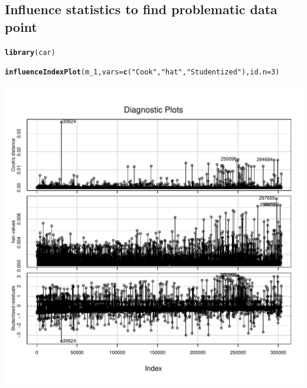 \documentclass{article}\usepackage[]{graphicx}\usepackage[]{color}
\makeatletter
\def\maxwidth{ %
  \ifdim\Gin@nat@width>\linewidth
    \linewidth
  \else
    \Gin@nat@width
  \fi
}
\newcommand{\hlnum}[1]{\textcolor[rgb]{0.686,0.059,0.569}{#1}}%
\newcommand{\hlstr}[1]{\textcolor[rgb]{0.192,0.494,0.8}{#1}}%
\newcommand{\hlstd}[1]{\textcolor[rgb]{0.345,0.345,0.345}{#1}}%
\newcommand{\hlkwc}[1]{\textcolor[rgb]{0.333,0.667,0.333}{#1}}%
\newcommand{\hlkwd}[1]{\textcolor[rgb]{0.737,0.353,0.396}{\textbf{#1}}}%
\newenvironment{kframe}{%
 \def\at@end@of@kframe{}%
 \ifinner\ifhmode%
  \def\at@end@of@kframe{\end{minipage}}%
  \begin{minipage}{\columnwidth}%
 \fi\fi%
 \def\FrameCommand##1{\hskip\@totalleftmargin \hskip-\fboxsep
 \colorbox{shadecolor}{##1}\hskip-\fboxsep
     \hskip-\linewidth \hskip-\@totalleftmargin \hskip\columnwidth}%
 \MakeFramed {\advance\hsize-\width
   \@totalleftmargin\z@ \linewidth\hsize
   \@setminipage}}%
 {\par\unskip\endMakeFramed%
 \at@end@of@kframe}
\newenvironment{knitrout}{}{} %
\makeatother
\begin{document}
\subsection{Influence statistics to find problematic data point}

\begin{knitrout}
\color{fgcolor}\begin{kframe}
\begin{alltt}
\hlkwd{library}\hlstd{(car)}
\end{alltt}


{\ttfamily\noindent\itshape\color{messagecolor}{\#\# \\\#\# Attaching package: 'car'}}

{\ttfamily\noindent\itshape\color{messagecolor}{\#\# The following object is masked from 'package:arm':\\\#\# \\\#\#\ \ \ \  logit}}\begin{alltt}
\hlkwd{influenceIndexPlot}\hlstd{(m_1,} \hlkwc{vars}\hlstd{=}\hlkwd{c}\hlstd{(}\hlstr{"Cook"}\hlstd{,}\hlstr{"hat"}\hlstd{,}\hlstr{"Studentized"}\hlstd{),} \hlkwc{id.n}\hlstd{=}\hlnum{3}\hlstd{)}
\end{alltt}
\end{kframe}
\includegraphics[width=\maxwidth]{figure/unnamed-chunk-3-1} 

\end{knitrout}
\end{document}
